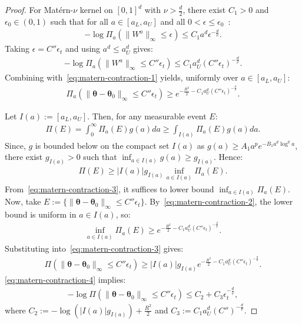 \documentclass[final,12pt]{colt2026} %
\begin{document}
\begin{proof}
For Mat\'{e}rn-$\nu$ kernel on $[0, 1]^{d}$ with $\nu > \frac{d}{2}$, there exist $C_1 > 0$ and $\epsilon_0 \in (0, 1)$ such that for all $a\in [a_L, a_U]$ and all $0< \epsilon \leq \epsilon_0$~\citep{vdv-vz-2008,vdv-vz-2011}:
\begin{align*}
-\log \Pi_a\left(\lVert W^{a}\rVert_{\infty} \leq \epsilon\right) \leq C_1 a^{d}\epsilon^{-\frac{d}{\nu}}.
\end{align*}
Taking $\epsilon = C'' \epsilon_t$ and using $a^{d} \leq a_U^{d}$ gives:
\begin{align*}
-\log \Pi_a\left(\lVert W^{a}\rVert_{\infty} \leq C''\epsilon_t\right) \leq C_1 a_U^{d} (C''\epsilon_t)^{-\frac{d}{\nu}}.
\end{align*}
Combining with~\eqref{eq:matern-contraction-1} yields, uniformly over $a\in [a_L, a_U]$:
\begin{align}
\label{eq:matern-contraction-2}
\Pi_a\left(\lVert \pmb\theta-\pmb\theta_0\rVert_{\infty} \leq C''\epsilon_t\right) \geq e^{-\frac{R^2}{2} - C_1 a_U^{d} (C''\epsilon_t)^{-\frac{d}{\nu}}}.
\end{align}

Let $I(a):= [a_L, a_U]$. Then, for any measurable event $E$:
\begin{align*}
\Pi(E) = \int_{0}^{\infty}\Pi_a(E) g(a)da \geq \int_{I(a)} \Pi_a(E) g(a) da. 
\end{align*}
Since, $g$ is bounded below on the compact set $I(a)$ as $g(a) \geq A_1 a^{p}e^{-B_1 a^{d}\log^{q}a}$, there exist $g_{I(a)} > 0$ such that $\inf_{a\in I(a)} g(a) \geq g_{I(a)}$. Hence:
\begin{align}
\label{eq:matern-contraction-3}
\Pi(E) \geq |I(a)| g_{I(a)} \inf_{a\in I(a)}\Pi_a(E).
\end{align}
From~\eqref{eq:matern-contraction-3}, it suffices to lower bound $\inf_{a\in I(a)}\Pi_a(E)$. Now, take $E:= \{\lVert \pmb\theta-\pmb\theta_0\rVert_{\infty} \leq C''\epsilon_t\}$. By~\eqref{eq:matern-contraction-2}, the lower bound is uniform in $a\in I(a)$, so:
\begin{align*}
\inf_{a\in I(a)} \Pi_a(E) \geq e^{-\frac{R^2}{2} - C_1 a_U^{d}(C''\epsilon_t)^{-\frac{d}{\nu}}}.
\end{align*}
Substituting into~\eqref{eq:matern-contraction-3} gives:
\begin{align}
\label{eq:matern-contraction-4}
\Pi\left(\lVert \pmb\theta - \pmb\theta_0\rVert_{\infty} \leq C''\epsilon_t\right) \geq |I(a)| g_{I(a)}e^{-\frac{R^2}{2} - C_1 a_U^{d}(C'' \epsilon_t)^{-\frac{d}{\nu}}}.
\end{align}
\eqref{eq:matern-contraction-4} implies:
\begin{align*}
-\log \Pi\left(\lVert \pmb\theta-\pmb\theta_0\rVert_{\infty} \leq C''\epsilon_t\right) \leq C_2 + C_3\epsilon_t^{-\frac{d}{\nu}},
\end{align*}
where $C_2 := -\log (|I(a)|g_{I(a)}) + \frac{R^2}{2}$ and $C_3:= C_1 a_U^{d}(C'')^{-\frac{d}{\nu}}$.


\end{proof}
\end{document}

